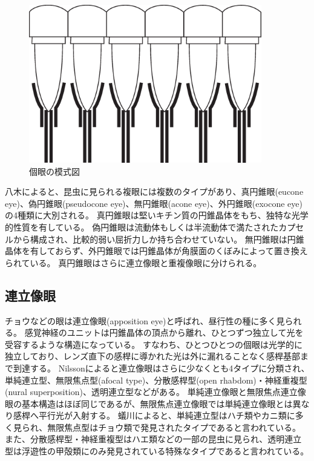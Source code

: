 \begin{figure}[hn]
  \centering
  \includegraphics[width=4.0in]{./img/ommatidia.eps}
  \caption{個眼の模式図}
  \label{FOmmatidia}
\end{figure}

八木\cite{yagi1951studies}によると、昆虫に見られる複眼には複数のタイプがあり、真円錐眼(eucone eye)、偽円錐眼(pseudocone eye)、無円錐眼(acone eye)、外円錐眼(exocone eye)の4種類に大別される。
真円錐眼は堅いキチン質の円錐晶体をもち、独特な光学的性質を有している。
偽円錐眼は流動体もしくは半流動体で満たされたカプセルから構成され、比較的弱い屈折力しか持ち合わせていない。
無円錐眼は円錐晶体を有しておらず、外円錐眼では円錐晶体が角膜面のくぼみによって置き換えられている。
真円錐眼はさらに連立像眼と重複像眼に分けられる。

\subsection{連立像眼}

チョウなどの眼は連立像眼(apposition eye)と呼ばれ、昼行性の種に多く見られる。
感覚神経のユニットは円錐晶体の頂点から離れ、ひとつずつ独立して光を受容するような構造になっている\cite{arikawa-zougan}。
すなわち、ひとつひとつの個眼は光学的に独立しており、レンズ直下の感桿に導かれた光は外に漏れることなく感桿基部まで到達する。
Nilsson\cite{nilsson1989optics}によると連立像眼はさらに少なくとも4タイプに分類され、単純連立型、無限焦点型(afocal type)、分散感桿型(open rhabdom)・神経重複型(nural superposition)、透明連立型などがある。
単純連立像眼と無限焦点連立像眼の基本構造はほぼ同じであるが、無限焦点連立像眼では単純連立像眼とは異なり感桿へ平行光が入射する。
蟻川\cite{arikawa-zougan}によると、単純連立型はハチ類やカニ類に多く見られ、無限焦点型はチョウ類で発見されたタイプであると言われている。
また、分散感桿型・神経重複型はハエ類などの一部の昆虫に見られ、透明連立型は浮遊性の甲殻類にのみ発見されている特殊なタイプであると言われている。

